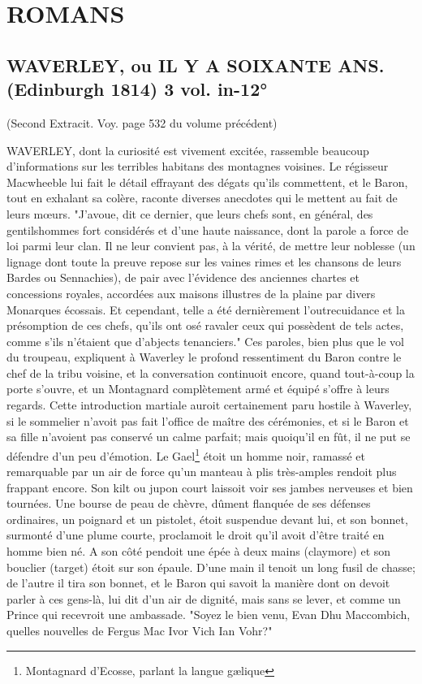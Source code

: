 \setcounter{page}{99}
\chapter{ROMANS}
\section{WAVERLEY, ou IL Y A SOIXANTE ANS. (Edinburgh 1814) 3 vol. in-12°} \large{(Second Extracit. Voy. page 532 du volume précédent)}

WAVERLEY, dont la curiosité est vivement excitée, rassemble beaucoup d'informations sur les terribles habitans des montagnes voisines. Le régisseur Macwheeble lui fait le détail effrayant des dégats qu'ils commettent, et le Baron, tout en exhalant sa colère, raconte diverses anecdotes qui le mettent au fait de leurs mœurs. "J'avoue, dit ce dernier, que leurs chefs sont, en général, des gentilshommes fort considérés et d'une haute naissance, dont la parole a force de loi\setcounter{page}{100} parmi leur clan. Il ne leur convient pas, à la vérité, de mettre leur noblesse (un lignage dont toute la preuve repose sur les vaines rimes et les chansons de leurs Bardes ou Sennachies), de pair avec l'évidence des anciennes chartes et concessions royales, accordées aux maisons illustres de la plaine par divers Monarques écossais. Et cependant, telle a été dernièrement l'outrecuidance et la présomption de ces chefs, qu'ils ont osé ravaler ceux qui possèdent de tels actes, comme s'ils n'étaient que d'abjects tenanciers."
Ces paroles, bien plus que le vol du troupeau, expliquent à Waverley le profond ressentiment du Baron contre le chef de la tribu voisine, et la conversation continuoit encore, quand tout-à-coup la porte s'ouvre, et un Montagnard complètement armé et équipé s'offre à leurs regards. Cette introduction martiale auroit certainement paru hostile à Waverley, si le sommelier n'avoit pas fait l'office de maître des cérémonies, et si le Baron et sa fille n'avoient pas conservé un calme parfait; mais quoiqu'il en fût, il ne put se défendre d'un peu d'émotion. Le Gael\footnote{Montagnard d’Ecosse, parlant la langue gælique} étoit un homme noir, ramassé et\setcounter{page}{101} remarquable par un air de force qu'un manteau à plis très-amples rendoit plus frappant encore. Son kilt ou jupon court laissoit voir ses jambes nerveuses et bien tournées. Une bourse de peau de chèvre, dûment flanquée de ses défenses ordinaires, un poignard et un pistolet, étoit suspendue devant lui, et son bonnet, surmonté d'une plume courte, proclamoit le droit qu'il avoit d'être traité en homme bien né. A son côté pendoit une épée à deux mains (claymore) et son bouclier (target) étoit sur son épaule. D'une main il tenoit un long fusil de chasse; de l'autre il tira son bonnet, et le Baron qui savoit la manière dont on devoit parler à ces gens-là, lui dit d'un air de dignité, mais sans se lever, et comme un Prince qui recevroit une ambassade. "Soyez le bien venu, Evan Dhu Maccombich, quelles nouvelles de Fergus Mac Ivor Vich Ian Vohr?"
